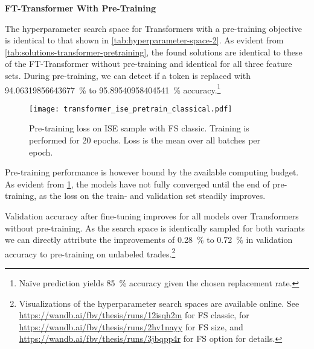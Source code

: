 \vskip 1.3in

\textbf{FT-Transformer With Pre-Training}

The hyperparameter search space for Transformers with a pre-training objective is identical to that shown in \cref{tab:hyperparameter-space-2}. As evident from \cref{tab:solutions-transformer-pretraining}, the found solutions are identical to these of the FT-Transformer without pre-training and identical for all three feature sets. During pre-training, we can detect if a token is replaced with \SI{94.06319856643677}{\percent} to \SI{95.89540958404541}{\percent} accuracy.\footnote{Na\"ive prediction yields \SI{85}{\percent} accuracy given the chosen replacement rate.}

\begin{figure}[!ht]
    \centering
    \texttt{[image: transformer\_ise\_pretrain\_classical.pdf]}
    \caption[Pre-Training Loss of FT-Transformer]{Pre-training loss on \gls{ISE} sample with \gls{FS} classic. Training is performed for 20 epochs. Loss is the mean over all batches per epoch.}
    \label{fig:fttransformer-pretrain-loss}
\end{figure}

Pre-training performance is however bound by the available computing budget. As evident from \cref{fig:fttransformer-pretrain-loss}, the models have not fully converged until the end of pre-training, as the loss on the train- and validation set steadily improves.

Validation accuracy after fine-tuning improves for all models over Transformers without pre-training. As the search space is identically sampled for both variants we can directly attribute the improvements of \SI{0.28}{\percent} to \SI{0.72}{\percent} in validation accuracy to pre-training on unlabeled trades.\footnote{Visualizations of the hyperparameter search spaces are available online. See \url{https://wandb.ai/fbv/thesis/runs/12isqh2m} for \gls{FS} classic, for \url{https://wandb.ai/fbv/thesis/runs/2hv1nayy} for \gls{FS} size, and \url{https://wandb.ai/fbv/thesis/runs/3jbqpp4r} for \gls{FS} option for details.}


